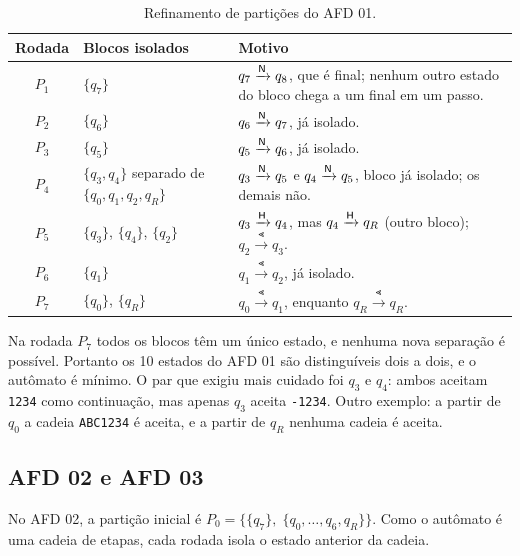 \begin{table}[ht]
\centering
\small
\renewcommand{\arraystretch}{1.3}
\begin{tabular}{c p{3.4cm} p{7.6cm}}
\toprule
Rodada & Blocos isolados & Motivo \\
\midrule
$P_1$ & $\{q_7\}$
  & $q_7 \xrightarrow{\mathsf{N}} q_8$, que é final; nenhum outro estado do bloco chega a um final em um passo. \\
$P_2$ & $\{q_6\}$
  & $q_6 \xrightarrow{\mathsf{N}} q_7$, já isolado. \\
$P_3$ & $\{q_5\}$
  & $q_5 \xrightarrow{\mathsf{N}} q_6$, já isolado. \\
$P_4$ & $\{q_3,q_4\}$ separado de $\{q_0,q_1,q_2,q_R\}$
  & $q_3 \xrightarrow{\mathsf{N}} q_5$ e $q_4 \xrightarrow{\mathsf{N}} q_5$, bloco já isolado; os demais não. \\
$P_5$ & $\{q_3\}$, $\{q_4\}$, $\{q_2\}$
  & $q_3 \xrightarrow{\mathsf{H}} q_4$, mas $q_4 \xrightarrow{\mathsf{H}} q_R$ (outro bloco); $q_2 \xrightarrow{\Lt} q_3$. \\
$P_6$ & $\{q_1\}$
  & $q_1 \xrightarrow{\Lt} q_2$, já isolado. \\
$P_7$ & $\{q_0\}$, $\{q_R\}$
  & $q_0 \xrightarrow{\Lt} q_1$, enquanto $q_R \xrightarrow{\Lt} q_R$. \\
\bottomrule
\end{tabular}
\caption{Refinamento de partições do AFD 01.}
\label{tab:min1}
\end{table}

Na rodada $P_7$ todos os blocos têm um único estado, e nenhuma nova
separação é possível. Portanto os 10 estados do AFD 01 são
distinguíveis dois a dois, e o autômato é mínimo. O par que exigiu
mais cuidado foi $q_3$ e $q_4$: ambos aceitam \texttt{1234} como
continuação, mas apenas $q_3$ aceita \texttt{-1234}. Outro exemplo:
a partir de $q_0$ a cadeia \texttt{ABC1234} é aceita, e a partir de
$q_R$ nenhuma cadeia é aceita.


\subsection{AFD 02 e AFD 03}

No AFD 02, a partição inicial é
$P_0 = \bigl\{ \{q_7\},\; \{q_0,\dots,q_6,q_R\} \bigr\}$. Como o
autômato é uma cadeia de etapas, cada rodada isola o estado
anterior da cadeia.

